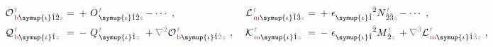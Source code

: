 \begin{subequations} \label{eq:multipole}
\begin{align}
	&{\mathcal{O}}^{\;\!\mathcolor{gray}{t}}_{\;\!\textcolor{Maroon}{\text{b}} \symup{\iota}\hat{1}\hat{2} \mathcolor{gray}{z}} \hspace{-1em}&&=\hspace{0.2em} +~ O^{\;\!\mathcolor{gray}{t}}_{\;\! \symup{\iota}\hat{1}\hat{2}\mathcolor{gray}{z}} &&\hspace{-1.1em}- \cdots~, &&\hspace{0.3em} {\mathcal{L}}^{\;\!\mathcolor{gray}{t}}_{\;\!\textcolor{Maroon}{\text{m}} \symup{\iota}\hat{1}\hat{3} \mathcolor{gray}{z}} \hspace{-1em}&&=\hspace{0.2em} +~ \epsilon^{\hphantom{\symup{\iota}\hat{1}}\hat{2}}_{\symup{\iota} \hat{1}} N^{\;\!\mathcolor{gray}{t}}_{\;\! \hat{2}\hat{3} \mathcolor{gray}{z}} &&\hspace{-1.1em}- \cdots~, \label{eq:Ob-Lm} \\
	&{\mathcal{Q}}^{\;\!\mathcolor{gray}{t}}_{\;\!\textcolor{Maroon}{\text{b}} \symup{\iota}\hat{1} \mathcolor{gray}{z}} \hspace{-1em}&&=\hspace{0.2em} -~ Q^{\;\!\mathcolor{gray}{t}}_{\;\! \symup{\iota}\hat{1}\mathcolor{gray}{z}} &&\hspace{-1.1em}+ \mathcolor{gray}{\nabla^{\hat{2}}} {\mathcal{O}}^{\;\!\mathcolor{gray}{t}}_{\;\!\textcolor{Maroon}{\text{b}} \symup{\iota} \hat{1} \mathcolor{gray}{\hat{2}} \mathcolor{gray}{z}}~,  &&\hspace{0.3em} {\mathcal{K}}^{\;\!\mathcolor{gray}{t}}_{\;\!\textcolor{Maroon}{\text{m}} \symup{\iota}\hat{1} \mathcolor{gray}{z}} \hspace{-1em}&&=\hspace{0.2em} -~ \epsilon^{\hphantom{\symup{\iota}\hat{1}}\hat{2}}_{\symup{\iota} \hat{1}} M^{\;\!\mathcolor{gray}{t}}_{\;\! \hat{2}\mathcolor{gray}{z}} &&\hspace{-1.1em}+ \mathcolor{gray}{\nabla^{\hat{3}}} {\mathcal{L}}^{\;\!\mathcolor{gray}{t}}_{\;\!\textcolor{Maroon}{\text{m}} \symup{\iota} \hat{1} \mathcolor{gray}{\hat{3}} \mathcolor{gray}{z}}~, \label{eq:Qb-Km} \\

\end{align}
\end{subequations}
